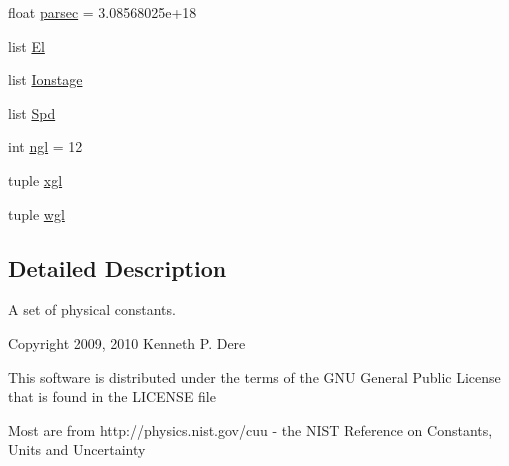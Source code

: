 \begin{DoxyCompactItemize}
$$float \hyperlink{namespacepyneb_1_1utils_1_1__chianti__constants_ab906e57659c35bfb7cd27aeadec38761}{parsec} = 3.\-08568025e+18
\item 
list \hyperlink{namespacepyneb_1_1utils_1_1__chianti__constants_a7ed9977115b347aa369f5d5ccd24a41f}{El}
\item 
list \hyperlink{namespacepyneb_1_1utils_1_1__chianti__constants_a6ba3a6e6b5b9a7296dcff5cd8655c88b}{Ionstage}
\item 
list \hyperlink{namespacepyneb_1_1utils_1_1__chianti__constants_aca66e52cd26761ab6aa375f99100d7c3}{Spd}
\item 
int \hyperlink{namespacepyneb_1_1utils_1_1__chianti__constants_a184d56e78c3d69a92e9136a9b09e5074}{ngl} = 12
\item 
tuple \hyperlink{namespacepyneb_1_1utils_1_1__chianti__constants_af3a02e5ae60445205fcd7a5a940fae65}{xgl}
\item 
tuple \hyperlink{namespacepyneb_1_1utils_1_1__chianti__constants_a194c43506d8baeaec4a0a9bdefdc02d2}{wgl}
\end{DoxyCompactItemize}


\subsection{Detailed Description}
\begin{DoxyVerb}A set of physical constants.

Copyright 2009, 2010 Kenneth P. Dere

This software is distributed under the terms of the GNU General Public License
that is found in the LICENSE file


Most are from http://physics.nist.gov/cuu - the NIST Reference on
Constants, Units and Uncertainty\end{DoxyVerb}
 

